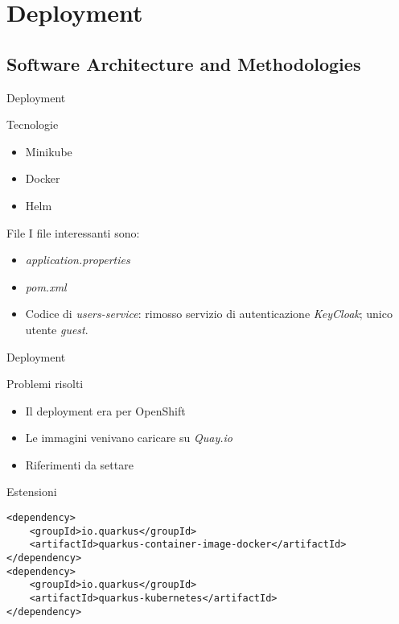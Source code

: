 \section{Deployment}

\subsection{Software Architecture and Methodologies}

\begin{frame}{Deployment}
    \begin{block}{Tecnologie}
        \begin{itemize}
            \item Minikube
            \item Docker
            \item Helm
        \end{itemize}
    \end{block}
    \begin{block}{File}
        I file interessanti sono:
        \begin{itemize}
            \item \textit{application.properties}
            \item \textit{pom.xml}
            \item Codice di \textit{users-service}: rimosso servizio di autenticazione \textit{KeyCloak}; unico utente \textit{guest}.
        \end{itemize}
    \end{block}
\end{frame}

\begin{frame}[fragile]{Deployment}
    \begin{block}{Problemi risolti}
        \begin{itemize}
            \item Il deployment era per OpenShift
            \item Le immagini venivano caricare su \textit{Quay.io}
            \item Riferimenti da settare
        \end{itemize}
    \end{block}
    \begin{block}{Estensioni}
        \begin{verbatim}
<dependency>
    <groupId>io.quarkus</groupId>
    <artifactId>quarkus-container-image-docker</artifactId>
</dependency>
<dependency>
    <groupId>io.quarkus</groupId>
    <artifactId>quarkus-kubernetes</artifactId>
</dependency>
        \end{verbatim}
    \end{block}
\end{frame}

